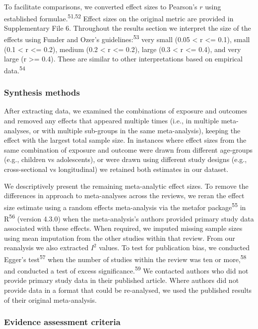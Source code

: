 \documentclass[
  english,
  man]{apa6}
\begin{document}
To facilitate comparisons, we converted effect sizes to Pearson's \(r\) using established formulae.\textsuperscript{51,52}
Effect sizes on the original metric are provided in Supplementary File 6.
Throughout the results section we interpret the size of the effects using Funder and Ozer's guidelines:\textsuperscript{53} very small (0.05 \textless{} r \textless= 0.1), small (0.1 \textless{} r \textless= 0.2), medium (0.2 \textless{} r \textless= 0.2), large (0.3 \textless{} r \textless= 0.4), and very large (r \textgreater= 0.4).
These are similar to other interpretations based on empirical data.\textsuperscript{54}

\hypertarget{synthesis-methods}{%
\subsubsection{Synthesis methods}\label{synthesis-methods}}

After extracting data, we examined the combinations of exposure and outcomes and removed any effects that appeared multiple times (i.e., in multiple meta-analyses, or with multiple sub-groups in the same meta-analysis), keeping the effect with the largest total sample size.
In instances where effect sizes from the same combination of exposure and outcome were drawn from different age-groups (e.g., children vs adolescents), or were drawn using different study designs (e.g., cross-sectional vs longitudinal) we retained both estimates in our dataset.

We descriptively present the remaining meta-analytic effect sizes.
To remove the differences in approach to meta-analyses across the reviews, we reran the effect size estimate using a random effects meta-analysis via the metafor package\textsuperscript{55} in R\textsuperscript{56} (version 4.3.0) when the meta-analysis's authors provided primary study data associated with these effects.
When required, we imputed missing sample sizes using mean imputation from the other studies within that review.
From our reanalysis we also extracted \(I^2\) values.
To test for publication bias, we conducted Egger's test\textsuperscript{57} when the number of studies within the review was ten or more,\textsuperscript{58} and conducted a test of excess significance.\textsuperscript{59}
We contacted authors who did not provide primary study data in their published article.
Where authors did not provide data in a format that could be re-analysed, we used the published results of their original meta-analysis.

\hypertarget{evidence-assessment-criteria}{%
\subsubsection{Evidence assessment criteria}\label{evidence-assessment-criteria}}
\end{document}
